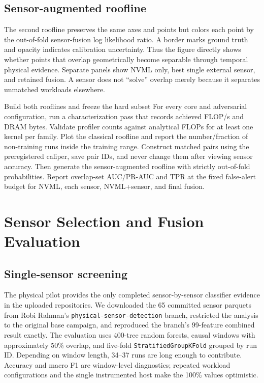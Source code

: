 \documentclass[sigplan,anonymous,review,nonacm]{acmart}
\begin{document}
\subsection{Sensor-augmented roofline}

The second roofline preserves the same axes and points but colors each point by the out-of-fold sensor-fusion log likelihood ratio. A border marks ground truth and opacity indicates calibration uncertainty. Thus the figure directly shows whether points that overlap geometrically become separable through temporal physical evidence. Separate panels show NVML only, best single external sensor, and retained fusion. A sensor does not ``solve'' overlap merely because it separates unmatched workloads elsewhere.

\begin{experimentbox}{Build both rooflines and freeze the hard subset}
For every core and adversarial configuration, run a characterization pass that records achieved FLOP/s and DRAM bytes. Validate profiler counts against analytical FLOPs for at least one kernel per family. Plot the classical roofline and report the number/fraction of non-training runs inside the training range. Construct matched pairs using the preregistered caliper, save pair IDs, and never change them after viewing sensor accuracy. Then generate the sensor-augmented roofline with strictly out-of-fold probabilities. Report overlap-set AUC/PR-AUC and TPR at the fixed false-alert budget for NVML, each sensor, NVML+sensor, and final fusion.
\end{experimentbox}

\section{Sensor Selection and Fusion Evaluation}
\label{sec:selection}

\subsection{Single-sensor screening}

\label{sec:physical-pilot}
The physical pilot provides the only completed sensor-by-sensor classifier evidence in the uploaded repositories. We downloaded the 65 committed sensor parquets from Robi Rahman's \texttt{physical-sensor-detection} branch, restricted the analysis to the original base campaign, and reproduced the branch's 99-feature combined result exactly. The evaluation uses 400-tree random forests, causal windows with approximately 50\% overlap, and five-fold \texttt{StratifiedGroupKFold} grouped by run ID. Depending on window length, 34--37 runs are long enough to contribute. Accuracy and macro F1 are window-level diagnostics; repeated workload configurations and the single instrumented host make the 100\% values optimistic.
\end{document}

